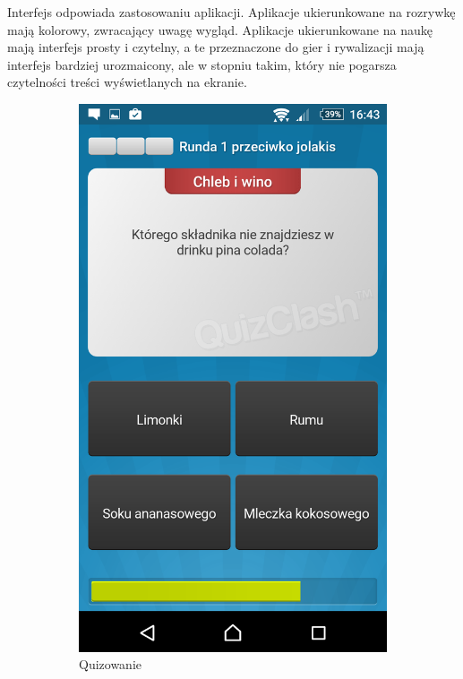 \documentclass{report}
\begin{document}
		Interfejs odpowiada zastosowaniu aplikacji. Aplikacje ukierunkowane na rozrywkę mają kolorowy, zwracający uwagę wygląd. Aplikacje ukierunkowane na naukę mają interfejs prosty i czytelny, a te przeznaczone do gier i rywalizacji mają interfejs bardziej urozmaicony, ale w stopniu takim, który nie pogarsza czytelności treści wyświetlanych na ekranie.
		
		\begin{figure}[ht]
			\centering
			\begin{subfigure}{.3\textwidth}
				\centering
				\includegraphics[width=.7\linewidth]{Quizowanie.png}
				\caption{Quizowanie}
				\label{fig:quizowanie}
			\end{subfigure}
			\begin{subfigure}{.3\textwidth}
				\centering

\end{subfigure}
\end{figure}
\end{document}

